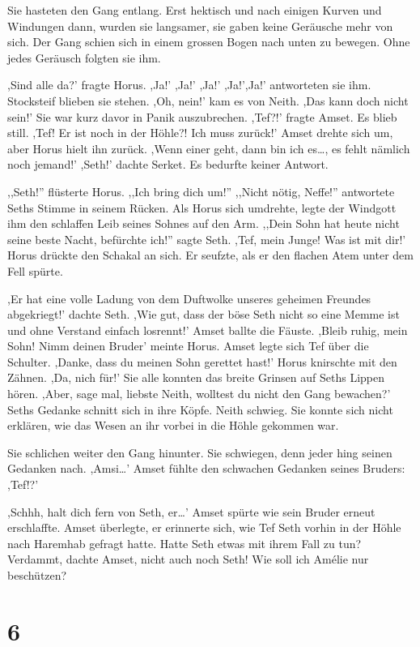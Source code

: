 \documentclass[11pt,titlepage,a5paper]{book}
\newcommand{\am}{Amélie }
\begin{document}
Sie hasteten den Gang entlang. Erst hektisch und nach einigen Kurven und Windungen dann, wurden sie langsamer, sie gaben keine Geräusche mehr von sich. Der Gang schien sich in einem grossen Bogen nach unten zu bewegen. Ohne jedes Geräusch folgten sie ihm.

,Sind alle da?' fragte Horus. ,Ja!' ,Ja!' ,Ja!' ,Ja!',Ja!' antworteten sie ihm. Stocksteif blieben sie stehen. ,Oh, nein!' kam es von Neith. ,Das kann doch nicht sein!' Sie war kurz davor in Panik auszubrechen. ,Tef?!' fragte Amset. Es blieb still. ,Tef! Er ist noch in der Höhle?! Ich muss zurück!' Amset drehte sich um, aber Horus hielt ihn zurück. ,Wenn einer geht, dann bin ich es\dots, es fehlt nämlich noch jemand!' ,Seth!' dachte Serket. Es bedurfte keiner Antwort.

,,Seth!'' flüsterte Horus. ,,Ich bring dich um!'' ,,Nicht nötig, Neffe!'' antwortete Seths Stimme in seinem Rücken. Als Horus sich umdrehte, legte der Windgott ihm den schlaffen Leib seines Sohnes auf den Arm. ,,Dein Sohn hat heute nicht seine beste Nacht, befürchte ich!'' sagte Seth. ,Tef, mein Junge! Was  ist mit dir!' Horus drückte den Schakal an sich. Er seufzte, als er den flachen Atem unter dem Fell spürte.

,Er hat eine volle Ladung von dem Duftwolke unseres geheimen Freundes abgekriegt!' dachte Seth. ,Wie gut, dass der böse Seth nicht so eine Memme ist und ohne Verstand einfach losrennt!' Amset ballte die Fäuste. ,Bleib ruhig, mein Sohn! Nimm deinen Bruder' meinte Horus. Amset legte sich Tef über die Schulter. ,Danke, dass du meinen Sohn gerettet hast!' Horus knirschte mit den Zähnen. ,Da, nich für!' Sie alle konnten das breite Grinsen auf Seths Lippen hören. ,Aber, sage mal, liebste Neith, wolltest du nicht den Gang bewachen?' Seths Gedanke schnitt sich in ihre Köpfe. Neith schwieg. Sie konnte sich nicht erklären, wie das Wesen an ihr vorbei in die Höhle gekommen war. 

Sie schlichen weiter den Gang hinunter. Sie schwiegen, denn jeder hing seinen Gedanken nach. ,Amsi\dots ' Amset fühlte den schwachen Gedanken seines Bruders: ,Tef!?'

,Schhh, halt dich fern von Seth, er\dots ' Amset spürte wie sein Bruder erneut erschlaffte. Amset überlegte, er erinnerte sich, wie Tef Seth vorhin in der Höhle nach Haremhab gefragt hatte. Hatte Seth etwas mit ihrem Fall zu tun? Verdammt, dachte Amset, nicht auch noch Seth! Wie soll ich \am nur beschützen?

\section*{6}
\end{document}
